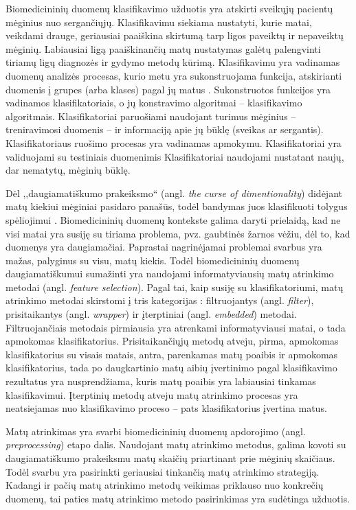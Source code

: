Biomedicininių duomenų klasifikavimo užduotis yra atskirti sveikųjų pacientų mėginius nuo sergančiųjų. Klasifikavimu siekiama nustatyti, kurie matai, veikdami drauge, geriausiai paaiškina skirtumą tarp ligos paveiktų ir nepaveiktų mėginių. Labiausiai ligą paaiškinančių matų nustatymas galėtų palengvinti tiriamų ligų diagnozės ir gydymo metodų kūrimą. Klasifikavimu yra vadinamas duomenų analizės procesas, kurio metu yra sukonstruojama funkcija, atskirianti duomenis į grupes (arba klases) pagal jų matus \cite{fisher1936use}. Sukonstruotos funkcijos yra vadinamos klasifikatoriais, o jų konstravimo algoritmai -- klasifikavimo algoritmais. Klasifikatoriai paruošiami naudojant turimus mėginius -- treniravimosi duomenis -- ir informaciją apie jų būklę (sveikas ar sergantis). Klasifikatoriaus ruošimo procesas yra vadinamas apmokymu. Klasifikatoriai yra validuojami su testiniais duomenimis Klasifikatoriai naudojami nustatant naujų, dar nematytų, mėginių būklę.

Dėl ,,daugiamatiškumo prakeiksmo`` (angl. \textit{the curse of dimentionality}) didėjant matų kiekiui mėginiai pasidaro panašūs, todėl bandymas juos klasifikuoti tolygus spėliojimui \cite{bellman1966adaptive}. Biomedicininių duomenų kontekste galima daryti prielaidą, kad ne visi matai yra susiję su tiriama problema, pvz. gaubtinės žarnos vėžiu, dėl to, kad duomenys yra daugiamačiai. Paprastai nagrinėjamai problemai svarbus yra mažas, palyginus su visu, matų kiekis.  Todėl biomedicininių duomenų daugiamatiškumui sumažinti yra naudojami informatyviausių matų atrinkimo metodai \cite{guyon2003introduction} (angl. \textit{feature selection}). Pagal tai, kaip susiję su klasifikatoriumi, matų atrinkimo metodai skirstomi į tris kategorijas \cite{saeys2008robust}: filtruojantys (angl. \textit{filter}), prisitaikantys (angl. \textit{wrapper}) ir įterptiniai (angl. \textit{embedded}) metodai. Filtruojančiais metodais pirmiausia yra atrenkami informatyviausi matai, o tada apmokomas klasifikatorius. Prisitaikančiųjų 
metodų atveju, pirma, apmokomas klasifikatorius su visais matais, antra, parenkamas matų poaibis ir apmokomas klasifikatorius, tada po daugkartinio matų aibių įvertinimo pagal klasifikavimo rezultatus yra nusprendžiama, kuris matų poaibis yra labiausiai tinkamas klasifikavimui. Įterptinių metodų atveju matų atrinkimo procesas yra neatsiejamas nuo klasifikavimo proceso -- pats klasifikatorius įvertina matus.

Matų atrinkimas yra svarbi biomedicininių duomenų apdorojimo (angl. \textit{preprocessing}) etapo dalis. Naudojant matų atrinkimo metodus, galima kovoti su daugiamatiškumo prakeiksmu matų skaičių priartinant prie mėginių skaičiaus. Todėl svarbu yra pasirinkti geriausiai tinkančią matų atrinkimo strategiją. Kadangi ir pačių matų atrinkimo metodų veikimas priklauso nuo konkrečių duomenų, tai paties matų atrinkimo metodo pasirinkimas yra sudėtinga užduotis. 

